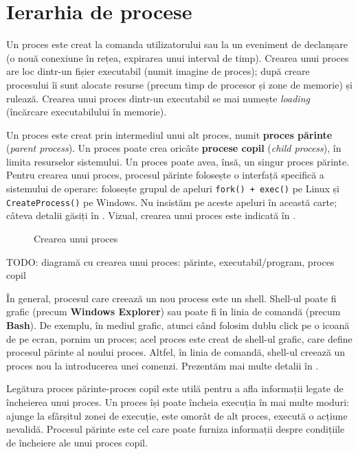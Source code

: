 \section{Ierarhia de procese}
\label{sec:procese-ierarhie}

Un proces este creat la comanda utilizatorului sau la un eveniment de declanșare
(o nouă conexiune în rețea, expirarea unui interval de timp). Crearea unui
proces are loc dintr-un fișier executabil (numit imagine de proces); după creare
procesului îi sunt alocate resurse (precum timp de procesor și zone de memorie)
și rulează. Crearea unui proces dintr-un executabil se mai numește
\textit{loading} (încărcare executabilului în memorie).

Un proces este creat prin intermediul unui alt proces, numit \textbf{proces părinte} (\textit{parent process}). Un
proces poate crea oricâte \textbf{procese copil} (\textit{child process}), în limita resurselor sistemului. Un
proces poate avea, însă, un singur proces părinte. Pentru crearea unui proces,
procesul părinte folosește o interfață specifică a sistemului de operare:
folosește grupul de apeluri \texttt{fork() + exec()} pe Linux și \texttt{CreateProcess()} pe
Windows. Nu insistăm pe aceste apeluri în această carte; câteva detalii găsiți
în . Vizual,
crearea unui proces este indicată în .

\begin{figure}[!htbp]
	\centering
        \def\svgwidth{0.8\textwidth}
        
        \caption{Crearea unui proces}
        \label{fig:process-create}
\end{figure}
TODO: diagramă cu crearea unui proces: părinte, executabil/program, proces copil

În general, procesul care creează un nou process este un shell. Shell-ul poate
fi grafic (precum \textbf{Windows Explorer}) sau poate fi în linia de comandă (precum
\textbf{Bash}). De exemplu, în mediul grafic, atunci când folosim dublu click pe o icoană
de pe ecran, pornim un proces; acel proces este creat de shell-ul grafic, care
define procesul părinte al noului proces. Altfel, în linia de comandă, shell-ul
creează un proces nou la introducerea unei comenzi. Prezentăm mai multe detalii
în .

Legătura proces părinte-proces copil este utilă pentru a afla informații legate
de încheierea unui proces. Un proces își poate încheia execuția în mai multe
moduri: ajunge la sfârșitul zonei de execuție, este omorât de alt proces,
execută o acțiune nevalidă. Procesul părinte este cel care poate furniza
informații despre condițiile de încheiere ale unui proces copil.

